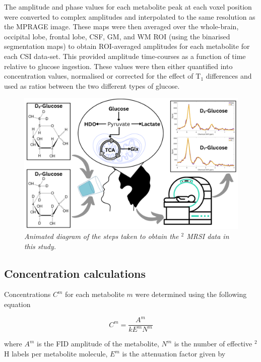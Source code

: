 The amplitude and phase values for each metabolite peak at each voxel position were converted to complex amplitudes and interpolated to the same resolution as the \ac{MPRAGE} image. These maps were then averaged over the whole-brain, occipital lobe, frontal lobe, \ac{CSF}, \ac{GM}, and \ac{WM} \ac{ROI} (using the binarised segmentation maps) to obtain \ac{ROI}-averaged amplitudes for each metabolite for each \ac{CSI} data-set. This provided amplitude time-courses as a function of time relative to glucose ingestion. These values were then either quantified into concentration values, normalised or corrected for the effect of T$_1$ differences and used as ratios between the two different types of glucose.

\begin{figure}
    \centering
    \includegraphics[width = 1\textwidth]{Figures/Glucose/Study_Day.png}
    \caption{\textit{Animated diagram of the steps taken to obtain the $^2$ MRSI data in this study.}}
    \label{fig:Glu:Study_Day}
\end{figure}

\subsection{Concentration calculations}

Concentrations $C^m$ for each metabolite $m$ were determined using the following equation

\begin{equation}
    C^m = \frac{A^m}{kE^mN^m}
    \label{eqn:Glu:Conc}
\end{equation}

where $A^m$ is the FID amplitude of the metabolite, $N^m$ is the number of effective $^2$H labels per metabolite molecule, $E^m$ is the attenuation factor given by

